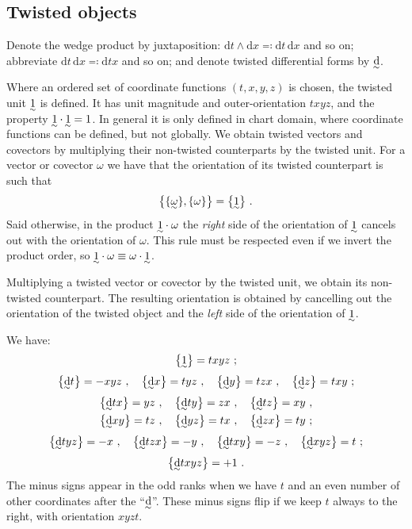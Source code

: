 \documentclass[\ifafour a4paper,12pt,\else a5paper,10pt,\fi%
onecolumn,oneside,article,%
british%
]{memoir}
\theoremstyle{remark}
\theoremstyle{innote}
\newcommand*{\di}{\mathrm{d}}%
\newcommand*{\defs}{\eqqcolon}
\DeclarePairedDelimiter\set{\{}{\}} %
\renewcommand*{\|}[1][]{\nonscript\:#1\vert\nonscript\:\mathopen{}}
\newcommand*{\eqn}{eq.}%
\newcommand*{\tw}[2][\scriptstyle\sim]{\smash[b]{\underset{\mathclap{{}^{#1}}}{#2}}}
\newcommand*{\ti}[1][\scriptstyle\sim]{\tw[#1]{\di}}
\begin{document}

\subsection{Twisted objects}
\label{sec:twisted}

Denote the wedge product by juxtaposition: $\di t \land \di x \defs \di t\, \di x$ and so on; abbreviate $\di t\, \di x \defs \di tx$ and so on; and denote twisted differential forms by $\ti$.

Where an ordered set of coordinate functions $(t,x,y,z)$ is chosen, the twisted unit $\tw{1}$ is defined. It has unit magnitude and outer-orientation $txyz$, and the property $\tw{1}\cdot\tw{1}=1$. In general it is only defined in chart domain, where coordinate functions can be defined, but not globally. We obtain twisted vectors and covectors by multiplying their non-twisted counterparts by the twisted unit. For a vector or covector $\omega$ we have that the orientation of its twisted counterpart is such that \autocites[\eqn~(28.1)]{burke1985_r1987}
\begin{equation}
  \label{eq:orientation_twisted_cov}
  \set[\big]{\set{\tw{\omega}}, \set{\omega}} = \set[\big]{\tw{1}}\ .
\end{equation}
Said otherwise, in the product $\tw{1} \cdot \omega$ the \emph{right} side of the orientation of $\tw{1}$ cancels out with the orientation of $\omega$. This rule must be respected even if we invert the product order, so $\tw{1} \cdot \omega \equiv \omega \cdot \tw{1}$.

Multiplying a twisted vector or covector by the twisted unit, we obtain its non-twisted counterpart. The resulting orientation is obtained by cancelling out the orientation of the twisted object and the \emph{left} side of the orientation of $\tw{1}$.

We have:
\begin{gather}
  \set[\big]{\tw{1}} = txyz \ ;
  \\[\jot]
  \set[\big]{\ti t} = -xyz \ , \quad
  \set[\big]{\ti x} = tyz \ , \quad
  \set[\big]{\ti y} = tzx \ , \quad
  \set[\big]{\ti z} = txy \ ;
  \\[\jot]
  \set[\big]{\ti tx} = yz \ , \quad
  \set[\big]{\ti ty} = zx \ , \quad
  \set[\big]{\ti tz} = xy \ , \\
  \set[\big]{\ti xy} = tz \ , \quad
  \set[\big]{\ti yz} = tx \ , \quad
  \set[\big]{\ti zx} = ty \ ;
  \\[\jot]
  \set[\big]{\ti tyz} = -x \ , \quad
  \set[\big]{\ti tzx} = -y \ , \quad
  \set[\big]{\ti txy} = -z \ , \quad
  \set[\big]{\ti xyz} = t \ ;
  \\[\jot]
  \set[\big]{\ti txyz} = +1 \ .
\end{gather}
The minus signs appear in the odd ranks when we have $t$ and an even number of other coordinates after the \enquote{$\ti$}. These minus signs flip if we keep $t$ always to the right, with orientation $xyzt$.
\end{document}
